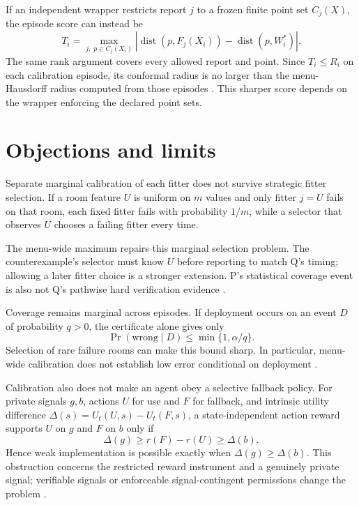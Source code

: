 \documentclass{article}
\begin{document}
If an independent wrapper restricts report \(j\) to a frozen finite point set \(C_j(X)\), the episode score can instead be
\[
T_i=\max_{j,\;p\in C_j(X_i)}
\left|\operatorname{dist}(p,F_j(X_i))
-\operatorname{dist}(p,W_i^*)\right|.
\]
The same rank argument covers every allowed report and point. Since \(T_i\leq R_i\) on each calibration episode, its conformal radius is no larger than the menu-Hausdorff radius computed from those episodes . This sharper score depends on the wrapper enforcing the declared point sets.

\section{Objections and limits}

\begin{objection}
Separate marginal calibration of each fitter does not survive strategic fitter selection. If a room feature \(U\) is uniform on \(m\) values and only fitter \(j=U\) fails on that room, each fixed fitter fails with probability \(1/m\), while a selector that observes \(U\) chooses a failing fitter every time.
\end{objection}

The menu-wide maximum repairs this marginal selection problem. The counterexample's selector must know \(U\) before reporting to match Q's timing; allowing a later fitter choice is a stronger extension. P's statistical coverage event is also not Q's pathwise hard verification evidence .

Coverage remains marginal across episodes. If deployment occurs on an event \(D\) of probability \(q>0\), the certificate alone gives only
\[
\Pr(\text{wrong}\mid D)\leq\min\{1,\alpha/q\}.
\]
Selection of rare failure rooms can make this bound sharp. In particular, menu-wide calibration does not establish low error conditional on deployment .

Calibration also does not make an agent obey a selective fallback policy. For private signals \(g,b\), actions \(U\) for use and \(F\) for fallback, and intrinsic utility difference
\(\Delta(s)=U_t(U,s)-U_t(F,s)\), a state-independent action reward supports \(U\) on \(g\) and \(F\) on \(b\) only if
\[
\Delta(g)\geq r(F)-r(U)\geq\Delta(b).
\]
Hence weak implementation is possible exactly when
\(\Delta(g)\geq\Delta(b)\). This obstruction concerns the restricted reward instrument and a genuinely private signal; verifiable signals or enforceable signal-contingent permissions change the problem .
\end{document}

